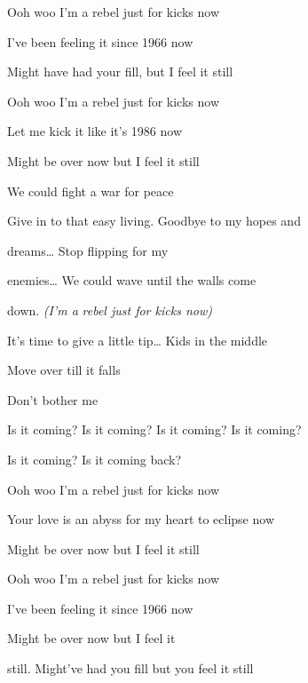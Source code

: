 \begin{song}
 Ooh woo I'm a rebel just for kicks now \par
{} I've been feeling it since 1966 now \par
{} Might have had your fill, but I feel it still \par

\bigskip

 Ooh woo I'm a rebel just for kicks now \par
{} Let me kick it like it's 1986 now \par
{} Might be over now but I feel it still \par

\bigskip

We could fight a war for peace  \par
{}Give in to that easy living. Goodbye to my hopes and \par
{}dreams… Stop flipping for my \par
enemies… We could wave until the walls come \par
{}down. \textit{(I'm a }\textit{rebel just for kicks now)} \par
It's time to give a little tip… Kids in the middle \par
Move over till it falls \par
Don't bother me \par

\bigskip

Is it coming? Is it coming? Is it coming? Is it coming? \par
{}Is it coming? Is it coming back? \par

\bigskip

 Ooh woo I'm a rebel just for kicks now \par
Your love is an abyss for my heart to eclipse now \par
{} Might be over now but I feel it still \par

\bigskip

 Ooh woo I'm a rebel just for kicks now \par
{} I've been feeling it since 1966 now \par
{} Might be over now but I feel it \par
{}still. Might've had you fill but you feel it still \par

\end{song}
